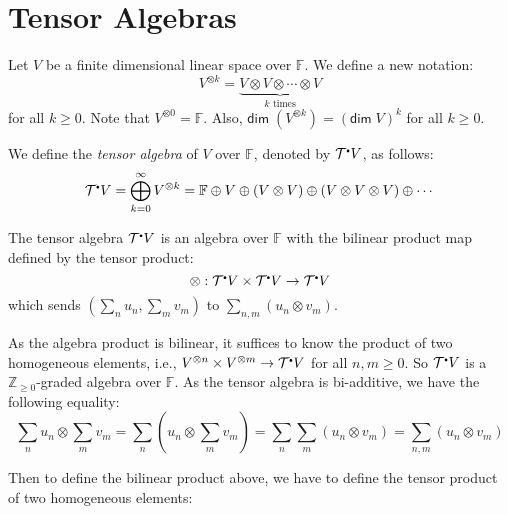 \documentclass[
	11pt, %
	fleqn, %
	a4paper, %
]{LegrandOrangeBook}
\newcommand{\smallbullet}{\scalebox{0.5}{$\bullet$}}
\newcommand{\F}{\mathbb{F}} %
\newcommand{\T}{\mathcal{T}^{\smallbullet}} %
\newcommand{\Z}{\mathbb{Z}} %
\renewcommand{\dim}{\mathsf{dim\;}} %
\begin{document}
\newpage

\section{Tensor Algebras}

Let $V$ be a finite dimensional linear space over $\F$. We define a new notation:
\[
    V^{\otimes k} = \underbrace{V \otimes V \otimes \cdots \otimes V}_{k \text{ times}}
\]
for all $k \geq 0$. Note that $V^{\otimes 0} = \F$. Also, $\dim(V^{\otimes k}) = (\dim{V})^k$ for all $k \geq 0$.

We define the \emph{tensor algebra} of $V$ over $\F$, denoted by $\T V$, as follows:
\[
    \T V = \bigoplus_{k = 0}^{\infty} V^{\otimes k} = \F \oplus V \oplus (V \otimes V) \oplus (V \otimes V \otimes V) \oplus \cdots
\]

The tensor algebra $\T V$ is an algebra over $\F$ with the bilinear product map defined by the tensor product:
\[
    \otimes : \T V \times \T V \to \T V
\]
which sends $(\sum_n u_n, \sum_m v_m)$ to $\sum_{n, m} (u_n \otimes v_m)$.

\begin{remark}
    As the algebra product is bilinear, it suffices to know the product of two homogeneous elements, i.e., $V^{\otimes n} \times V^{\otimes m} \to \T V$ for all $n, m \geq 0$. So $\T V$ is a $\Z_{\geq 0}$-graded algebra over $\F$. As the tensor algebra is bi-additive, we have the following equality:
    \[
        \sum_n u_n \otimes \sum_m v_m = \sum_n (u_n \otimes \sum_m v_m) = \sum_n \sum_m (u_n \otimes v_m) = \sum_{n, m} (u_n \otimes v_m)
    \]
\end{remark}

Then to define the bilinear product above, we have to define the tensor product of two homogeneous elements:
\begin{center}
\end{center}
\end{document}
